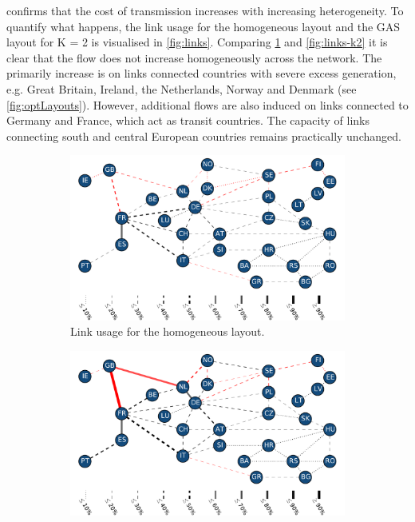 \documentclass[a4paper, 5p, sort&compress]{elsarticle}%
\begin{document}
 confirms that the cost of transmission increases
with increasing heterogeneity. To quantify what happens, the link
usage for the homogeneous layout and the GAS layout for K = 2 is
visualised in \cref{fig:links}. Comparing \cref{fig:links-homo} and
\cref{fig:links-k2} it is clear that the flow does not increase
homogeneously across the network. The primarily increase is on links
connected countries with severe excess generation, e.g. Great Britain,
Ireland, the Netherlands, Norway and Denmark (see
\cref{fig:optLayouts}). However, additional flows are also induced on
links connected to Germany and France, which act as transit
countries. The capacity of links connecting south and central European
countries remains practically unchanged.

\begin{figure}[t!]
  \centering
  \begin{subfigure}{1\columnwidth}
    \includegraphics[width = \columnwidth, center]{links-homogeneous}
    \caption{Link usage for the homogeneous layout.}
    \label{fig:links-homo}
  \end{subfigure}
  \begin{subfigure}{1\columnwidth}
    \includegraphics[width = \columnwidth, center]{links-gas-k=2}

\end{subfigure}
\end{figure}
\end{document}
